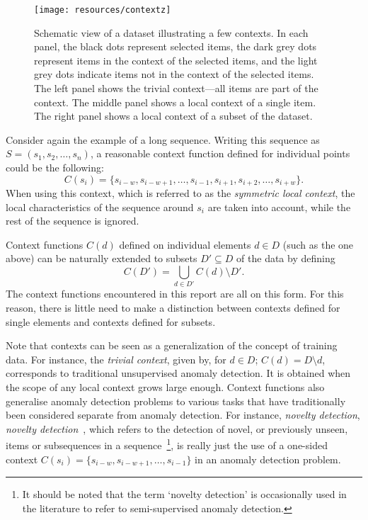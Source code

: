 \begin{figure}[thb]
    \vspace{-4pt}
    \begin{center}
        \leavevmode
        \texttt{[image: resources/contextz]}
    \end{center}
    \vspace{-15pt}
    \caption{{\small Schematic view of a dataset illustrating a few contexts. In each panel, the black dots represent selected items, the dark grey dots represent items in the context of the selected items, and the light grey dots indicate items not in the context of the selected items. The left panel shows the trivial context---all items are part of the context. The middle panel shows a local context of a single item. The right panel shows a local context of a subset of the dataset.}}
\label{fig:contexts}
    \vspace{-5pt}
\end{figure}

Consider again the example of a long sequence. Writing this sequence as $S = (s_1, s_2, \dots, s_n)$, a reasonable context function defined for individual points could be the following:
\[
    C(s_i) = \{s_{i-w}, s_{i - w + 1}, \dots, s_{i - 1}, s_{i + 1}, s_{i + 2}, \dots, s_{i + w}\}.
\]
When using this context, which is referred to as the \emph{symmetric local context}, the local characteristics of the sequence around $s_i$ are taken into account, while the rest of the sequence is ignored.

Context functions $C(d)$ defined on individual elements $d \in D$ (such as the one above) can be naturally extended to subsets $D' \subseteq D$ of the data by defining
\[
    C(D') = \bigcup_{d \in D'} C(d) \setminus D'.
\]
The context functions encountered in this report are all on this form. For this reason, there is little need to make a distinction between contexts defined for single elements and contexts defined for subsets.

Note that contexts can be seen as a generalization of the concept of training data. For instance, the \emph{trivial context}, given by, for $d \in D$; $C(d) = D \setminus d$, corresponds to traditional unsupervised anomaly detection. It is obtained when the scope of any local context grows large enough. Context functions also generalise anomaly detection problems to various tasks that have traditionally been considered separate from anomaly detection. For instance, \emph{novelty detection}, \emph{novelty detection}~\cite{chandola}, which refers to the detection of novel, or previously unseen, items or subsequences in a sequence~\footnote{It should be noted that the term `novelty detection' is occasionally used in the literature to refer to semi-supervised anomaly detection.}, is really just the use of a one-sided context $C(s_i) = \{s_{i-w}, s_{i - w + 1}, \dots, s_{i - 1}\}$ in an anomaly detection problem.

